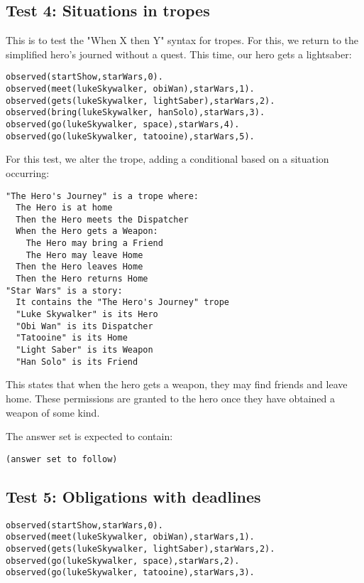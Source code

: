 \documentclass[11pt]{article}
\begin{document}
\subsection{Test 4: Situations in tropes}
\label{sec:orgheadline5}

This is to test the "When X then Y" syntax for tropes. For this, we return to the simplified hero's journed without a quest. This time, our hero gets a lightsaber:

\begin{verbatim}
observed(startShow,starWars,0).
observed(meet(lukeSkywalker, obiWan),starWars,1).
observed(gets(lukeSkywalker, lightSaber),starWars,2).
observed(bring(lukeSkywalker, hanSolo),starWars,3).
observed(go(lukeSkywalker, space),starWars,4).
observed(go(lukeSkywalker, tatooine),starWars,5).
\end{verbatim}

For this test, we alter the trope, adding a conditional based on a situation occurring:

\begin{verbatim}
"The Hero's Journey" is a trope where:
  The Hero is at home
  Then the Hero meets the Dispatcher
  When the Hero gets a Weapon:
    The Hero may bring a Friend
    The Hero may leave Home
  Then the Hero leaves Home
  Then the Hero returns Home
"Star Wars" is a story:
  It contains the "The Hero's Journey" trope
  "Luke Skywalker" is its Hero
  "Obi Wan" is its Dispatcher
  "Tatooine" is its Home
  "Light Saber" is its Weapon
  "Han Solo" is its Friend
\end{verbatim}

This states that when the hero gets a weapon, they may find friends and leave home. These permissions are granted to the hero once they have obtained a weapon of some kind.

The answer set is expected to contain:

\begin{verbatim}
(answer set to follow)
\end{verbatim}


\subsection{Test 5: Obligations with deadlines}
\label{sec:orgheadline6}

\begin{verbatim}
observed(startShow,starWars,0).
observed(meet(lukeSkywalker, obiWan),starWars,1).
observed(gets(lukeSkywalker, lightSaber),starWars,2).
observed(go(lukeSkywalker, space),starWars,2).
observed(go(lukeSkywalker, tatooine),starWars,3).
\end{verbatim}
\end{document}
